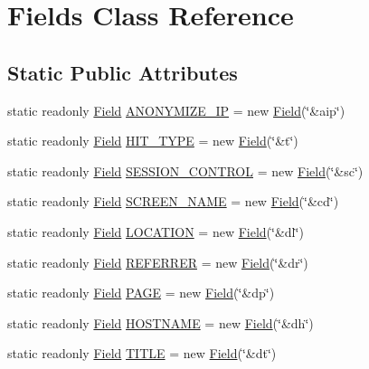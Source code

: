 \hypertarget{class_fields}{}\section{Fields Class Reference}
\label{class_fields}
\subsection*{Static Public Attributes}
\begin{DoxyCompactItemize}
\item 
static readonly \hyperlink{class_field}{Field} \hyperlink{class_fields_a1ad5c9bea5be1010f7c34d7c889411e9}{A\+N\+O\+N\+Y\+M\+I\+Z\+E\+\_\+\+IP} = new \hyperlink{class_field}{Field}(\char`\"{}\&aip\char`\"{})
\item 
static readonly \hyperlink{class_field}{Field} \hyperlink{class_fields_a11d0e0bb3224a07ce7752030d069dda7}{H\+I\+T\+\_\+\+T\+Y\+PE} = new \hyperlink{class_field}{Field}(\char`\"{}\&t\char`\"{})
\item 
static readonly \hyperlink{class_field}{Field} \hyperlink{class_fields_aa22cc9513e8299f6fb7fa9164f51c385}{S\+E\+S\+S\+I\+O\+N\+\_\+\+C\+O\+N\+T\+R\+OL} = new \hyperlink{class_field}{Field}(\char`\"{}\&sc\char`\"{})
\item 
static readonly \hyperlink{class_field}{Field} \hyperlink{class_fields_a0c80922722dbd02c4edb62e612193b40}{S\+C\+R\+E\+E\+N\+\_\+\+N\+A\+ME} = new \hyperlink{class_field}{Field}(\char`\"{}\&cd\char`\"{})
\item 
static readonly \hyperlink{class_field}{Field} \hyperlink{class_fields_a6d5e79a2e93ebc8c71ad710c3d2e94f0}{L\+O\+C\+A\+T\+I\+ON} = new \hyperlink{class_field}{Field}(\char`\"{}\&dl\char`\"{})
\item 
static readonly \hyperlink{class_field}{Field} \hyperlink{class_fields_a40228d355a8309e92df57cdd40333cc2}{R\+E\+F\+E\+R\+R\+ER} = new \hyperlink{class_field}{Field}(\char`\"{}\&dr\char`\"{})
\item 
static readonly \hyperlink{class_field}{Field} \hyperlink{class_fields_a1150d4c55563c37cca09731a3c1348d6}{P\+A\+GE} = new \hyperlink{class_field}{Field}(\char`\"{}\&dp\char`\"{})
\item 
static readonly \hyperlink{class_field}{Field} \hyperlink{class_fields_a76a2caa9f10467bb0dc05637d6fecc4f}{H\+O\+S\+T\+N\+A\+ME} = new \hyperlink{class_field}{Field}(\char`\"{}\&dh\char`\"{})
\item 
static readonly \hyperlink{class_field}{Field} \hyperlink{class_fields_a9232edccf0520710de90c780f74c55b5}{T\+I\+T\+LE} = new \hyperlink{class_field}{Field}(\char`\"{}\&dt\char`\"{})

\end{DoxyCompactItemize}
